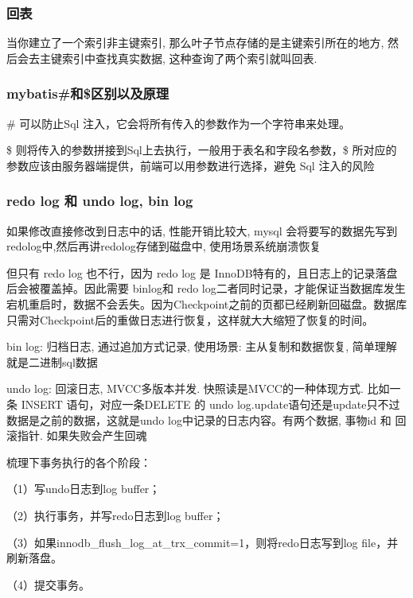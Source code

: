 \documentclass[UTF8]{ctexart}
\begin{document}
\subsubsection{回表}
当你建立了一个索引非主键索引, 那么叶子节点存储的是主键索引所在的地方, 然后会去主键索引中查找真实数据, 这种查询了两个索引就叫回表.
\subsubsection{mybatis\#和\$区别以及原理}
\#{ }可以防止Sql 注入，它会将所有传入的参数作为一个字符串来处理。

\$ {} 则将传入的参数拼接到Sql上去执行，一般用于表名和字段名参数，\$ 所对应的参数应该由服务器端提供，前端可以用参数进行选择，避免 Sql 注入的风险
\subsubsection{redo log 和 undo log, bin log }
如果修改直接修改到日志中的话, 性能开销比较大, mysql 会将要写的数据先写到redolog中,然后再讲redolog存储到磁盘中, 使用场景系统崩溃恢复 \par
但只有 redo log 也不行，因为 redo log 是 InnoDB特有的，且日志上的记录落盘后会被覆盖掉。因此需要 binlog和 redo log二者同时记录，才能保证当数据库发生宕机重启时，数据不会丢失。因为Checkpoint之前的页都已经刷新回磁盘。数据库只需对Checkpoint后的重做日志进行恢复，这样就大大缩短了恢复的时间。

bin log: 归档日志, 通过追加方式记录, 使用场景: 主从复制和数据恢复, 简单理解就是二进制sql数据 \par
undo log: 回滚日志, MVCC多版本并发. 快照读是MVCC的一种体现方式.
比如一条 INSERT 语句，对应一条DELETE 的 undo log.update语句还是update只不过数据是之前的数据，这就是undo log中记录的日志内容。有两个数据, 事物id 和 回滚指针. 如果失败会产生回魂


梳理下事务执行的各个阶段：

（1）写undo日志到log buffer；

（2）执行事务，并写redo日志到log buffer；

（3）如果innodb\_flush\_log\_at\_trx\_commit=1，则将redo日志写到log file，并刷新落盘。

（4）提交事务。
\end{document}
